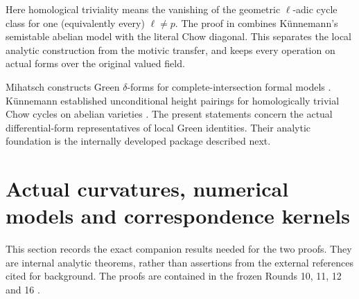 \documentclass[11pt,reqno]{amsart}
\newcommand{\Secref}[1]{{\hypersetup{linkcolor=mathteal}\Cref{#1}}}
\theoremstyle{definition}
\theoremstyle{remark}
\numberwithin{equation}{section}
\begin{document}
Here homological triviality means the vanishing of the geometric
$\ell$-adic cycle class for one (equivalently every) $\ell\ne p$.
The proof in \Secref{sec:motivproof} combines K\"unnemann's
semistable abelian model with the literal Chow diagonal.  This
separates the local analytic construction from the motivic
transfer, and keeps every operation on actual forms over the original
valued field.

Mihatsch constructs Green $\delta$-forms for complete-intersection
formal models \cite[Theorem~5.5]{Mihatsch}.  K\"unnemann established
unconditional height pairings for homologically trivial Chow cycles
on abelian varieties \cite{Kunnemann2001}.  The present statements
concern the actual differential-form representatives of local Green
identities.  Their analytic foundation is the internally developed
package described next.

\section{Actual curvatures, numerical models and correspondence kernels}
\label{sec:inputs}

This section records the exact companion results needed for the two
proofs.  They are internal analytic theorems, rather than assertions
from the external references cited for background.  The proofs
are contained in the frozen Rounds 10, 11, 12 and 16 \cite{R10,R11,R12,R16}.
\end{document}
